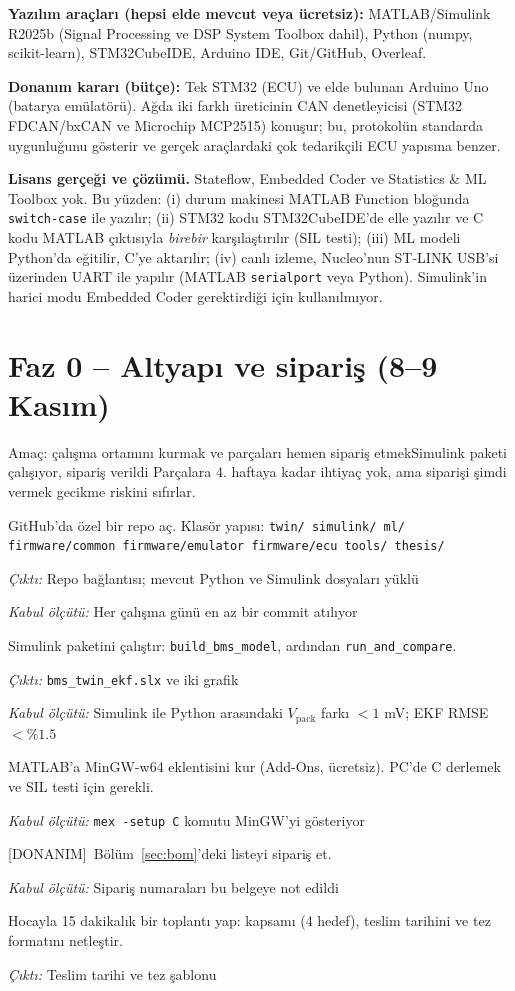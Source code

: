 \documentclass[11pt,a4paper]{article}
\newcommand{\cikti}[1]{\par{\small\textit{Çıktı:} #1}}
\newcommand{\kabul}[1]{\par{\small\textit{Kabul ölçütü:} #1}}
\newcommand{\donanim}{\textcolor{uyari}{\small[DONANIM]}\ }
\begin{document}
\textbf{Yazılım araçları (hepsi elde mevcut veya ücretsiz):} MATLAB/Simulink R2025b (Signal Processing ve DSP System Toolbox dahil), Python (numpy, scikit-learn), STM32CubeIDE, Arduino IDE, Git/GitHub, Overleaf.

\textbf{Donanım kararı (bütçe):} Tek STM32 (ECU) ve elde bulunan Arduino Uno (batarya emülatörü). Ağda iki farklı üreticinin CAN denetleyicisi (STM32 FDCAN/bxCAN ve Microchip MCP2515) konuşur; bu, protokolün standarda uygunluğunu gösterir ve gerçek araçlardaki çok tedarikçili ECU yapısına benzer.

\begin{dikkat}
\textbf{Lisans gerçeği ve çözümü.} Stateflow, Embedded Coder ve Statistics \& ML Toolbox yok. Bu yüzden:
(i) durum makinesi MATLAB Function bloğunda \texttt{switch-case} ile yazılır;
(ii) STM32 kodu STM32CubeIDE'de elle yazılır ve C kodu MATLAB çıktısıyla \emph{birebir} karşılaştırılır (SIL testi);
(iii) ML modeli Python'da eğitilir, C'ye aktarılır;
(iv) canlı izleme, Nucleo'nun ST-LINK USB'si üzerinden UART ile yapılır (MATLAB \texttt{serialport} veya Python).
Simulink'in harici modu Embedded Coder gerektirdiği için kullanılmıyor.
\end{dikkat}

\section{Faz 0 -- Altyapı ve sipariş (8--9 Kasım)}
\begin{faz}{Amaç: çalışma ortamını kurmak ve parçaları hemen sipariş etmek}{Simulink paketi çalışıyor, sipariş verildi}
Parçalara 4. haftaya kadar ihtiyaç yok, ama siparişi şimdi vermek gecikme riskini sıfırlar.
\end{faz}
\begin{gorev}
  \item GitHub'da özel bir repo aç. Klasör yapısı:
  \texttt{twin/ simulink/ ml/ firmware/common firmware/emulator firmware/ecu tools/ thesis/}
  \cikti{Repo bağlantısı; mevcut Python ve Simulink dosyaları yüklü}
  \kabul{Her çalışma günü en az bir commit atılıyor}
  \item[$\boxtimes$] Simulink paketini çalıştır: \texttt{build\_bms\_model}, ardından \texttt{run\_and\_compare}.
  \cikti{\texttt{bms\_twin\_ekf.slx} ve iki grafik}
  \kabul{Simulink ile Python arasındaki $V_\text{pack}$ farkı $<1$ mV; EKF RMSE $<\%1.5$}
  \item[$\boxtimes$] MATLAB'a MinGW-w64 eklentisini kur (Add-Ons, ücretsiz). PC'de C derlemek ve SIL testi için gerekli.
  \kabul{\texttt{mex -setup C} komutu MinGW'yi gösteriyor}
  \item[$\boxtimes$] \donanim Bölüm~\ref{sec:bom}'deki listeyi sipariş et.
  \kabul{Sipariş numaraları bu belgeye not edildi}
  \item Hocayla 15 dakikalık bir toplantı yap: kapsamı (4 hedef), teslim tarihini ve tez formatını netleştir.
  \cikti{Teslim tarihi ve tez şablonu}
\end{gorev}
\end{document}
